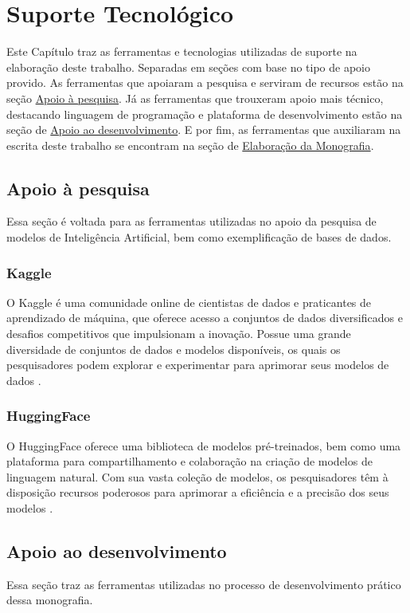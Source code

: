 \chapter[Suporte Tecnológico]{Suporte Tecnológico}

Este Capítulo traz as ferramentas e tecnologias utilizadas de suporte na elaboração deste trabalho. Separadas
em seções com base no tipo de apoio provido. As ferramentas que apoiaram a pesquisa e serviram de recursos estão na seção
\hyperref[sec:apoiopesquisa]{Apoio à pesquisa}. Já as ferramentas que trouxeram apoio mais técnico, destacando linguagem
de programação e plataforma de desenvolvimento estão na seção de \hyperref[sec:apoiodev]{Apoio ao desenvolvimento}.
E por fim, as ferramentas que auxiliaram na escrita deste trabalho se encontram na seção de \hyperref[sec:elaboracaomono]
{Elaboração da Monografia}.

\section{Apoio à pesquisa}\label{sec:apoiopesquisa}
Essa seção é voltada para as ferramentas utilizadas no apoio da pesquisa de modelos de Inteligência Artificial, bem
como exemplificação de bases de dados.

\subsection{Kaggle}\label{subsec:kaggle}
O Kaggle é uma comunidade online de cientistas de dados e praticantes de aprendizado de máquina, que 
oferece acesso a conjuntos de dados diversificados e desafios competitivos que impulsionam a inovação. Possue 
uma grande diversidade de conjuntos de dados e modelos disponíveis, os quais os pesquisadores podem explorar e 
experimentar para aprimorar seus modelos de dados \cite{kagglesite}.

\subsection{HuggingFace}\label{subsec:huggingface}
O HuggingFace oferece uma biblioteca de modelos pré-treinados, bem como uma plataforma para compartilhamento e 
colaboração na criação de modelos de linguagem natural. Com sua vasta coleção de modelos, os pesquisadores têm à 
disposição recursos poderosos para aprimorar a eficiência e a precisão dos seus modelos \cite{huggingsite}.

\section{Apoio ao desenvolvimento}\label{sec:apoiodev}
Essa seção traz as ferramentas utilizadas no processo de desenvolvimento prático dessa monografia.

